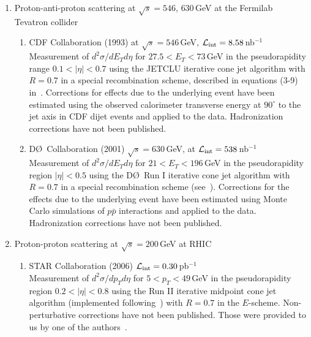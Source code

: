 \documentclass[11pt]{article}
\newcommand{\ppbar}{p{\bar{p}}}
\begin{document}
\begin{enumerate}
\begin{enumerate}
\end{enumerate}



\item Proton-anti-proton scattering at $\sqrt{s} = 546$, $630\,$GeV at the Fermilab Tevatron collider
\begin{enumerate}

\item CDF Collaboration (1993) 
     at $\sqrt{s} = 546\,$GeV,
      ${\cal L_{\rm int}}=8.58\,$nb$^{-1}$~\cite{Abe:1992bk} \\
Measurement of
$d^2\sigma/dE_T d\eta$  for $27.5<E_T<73\,$GeV
     in the pseudorapidity range $0.1<|\eta|<0.7$ 
using the
JETCLU iterative cone jet algorithm with $R=0.7$  in a special recombination scheme,
    described in equations (3-9) in~\cite{Affolder:2001fa}.
Corrections for effects due to the underlying event 
have been estimated using the observed calorimeter transverse energy 
at $90^\circ$ to the jet axis in CDF dijet events
and applied to the data. 
Hadronization corrections have not been published.




\item D\O\ Collaboration (2001) 
  $\sqrt{s} = 630\,$GeV,
     at ${\cal L_{\rm int}}=538\,$nb$^{-1}$~\cite{Abbott:2000kp}   \\
Measurement of
$d^2\sigma/dE_T d\eta$  for $21<E_T<196\,$GeV
     in the pseudorapidity region $|\eta|<0.5$ 
using the
D\O\ Run I iterative cone jet algorithm with $R=0.7$ 
  in a special recombination scheme (see~\cite{Abbott:2000kp}).
Corrections for the effects due to the underlying event 
have been estimated using Monte Carlo simulations 
of $\ppbar$ interactions and applied to the data. 
Hadronization corrections have not been published.

\end{enumerate}



\item Proton-proton scattering at $\sqrt{s} = 200\,$GeV at RHIC
\begin{enumerate}

\item STAR Collaboration (2006) 
      ${\cal L_{\rm int}}=0.30\,$pb$^{-1}$~\cite{Abelev:2006uq} \\
Measurement of
$d^2\sigma/dp_T d\eta$  for $5<p_T<49\,$GeV
     in the pseudorapidity region $0.2<|\eta|<0.8$ 
using the 
Run II iterative midpoint cone jet algorithm 
(implemented following~\cite{run2cone})
           with $R=0.7$ in the $E$-scheme. 
Non-perturbative corrections have not been published.
Those were provided to us by one of the authors~\cite{miller2006}. \\



\end{enumerate}
\end{enumerate}
\end{document}
